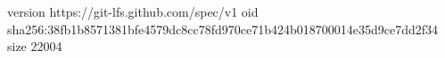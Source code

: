version https://git-lfs.github.com/spec/v1
oid sha256:38fb1b8571381bfe4579dc8cc78fd970ce71b424b018700014e35d9ce7dd2f34
size 22004
